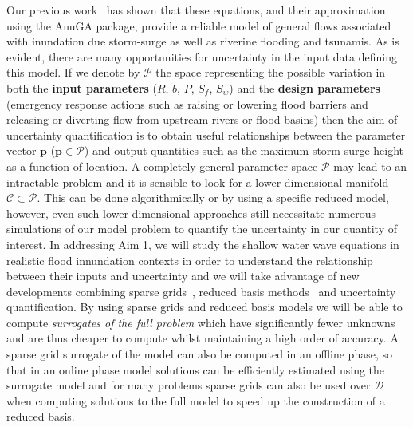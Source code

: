 Our previous work~\parencite{anugamanual,nielsen2005hydrodynamic} has shown that these
equations, and their approximation using the  AnuGA package, provide a reliable
model of general flows associated with inundation due storm-surge as well as riverine flooding and tsunamis.
As is evident, there are many opportunities for uncertainty in the input data defining this model. 
If we denote by $\mathcal{P}$ the space representing the possible variation in both the {\bf input parameters} ($R$, $b$, $P$, $S_f$, $S_w$) and the {\bf design parameters} (emergency response actions such as raising or lowering flood barriers and releasing or diverting flow from upstream rivers or flood basins) then the aim of uncertainty quantification is to obtain useful relationships between the parameter vector $\mathbf{p}$
($\mathbf{p} \in \mathcal{P}$) and output quantities such as the maximum storm surge height as a function of location. 
A completely general parameter space $\mathcal{P}$ may lead to an intractable problem and it is sensible to look for a lower dimensional manifold $\mathcal{C} \subset \mathcal{P}$.
This can be done algorithmically or by using a specific reduced model, however, even such lower-dimensional approaches still necessitate numerous simulations of our model problem to quantify the uncertainty in our quantity of interest. {In addressing Aim 1}, we will study the shallow water wave equations in realistic flood innundation contexts in order to understand the relationship between their inputs and uncertainty and we will take advantage of new
developments combining sparse
grids~\parencite{BungartzGriebel2004}, reduced basis
methods~\parencite{LiebermanEtal2010,Peherstorfer2013,ChenSchwab2015,PeherstorferWillcox2015}
and uncertainty quantification.
 By using sparse
grids and reduced basis models we will be able to compute
\emph{surrogates of the full problem} which have significantly fewer
unknowns and are thus cheaper to compute whilst maintaining a high
order of accuracy. 
A sparse grid surrogate of
the model  can also be computed in an offline phase,
so that in an online phase model solutions can be efficiently
estimated using the surrogate model and for many problems sparse grids
can also be used over $\mathcal{D}$ when computing solutions to the full
model to speed up the construction of a reduced basis.\\


 \iffalse
 
